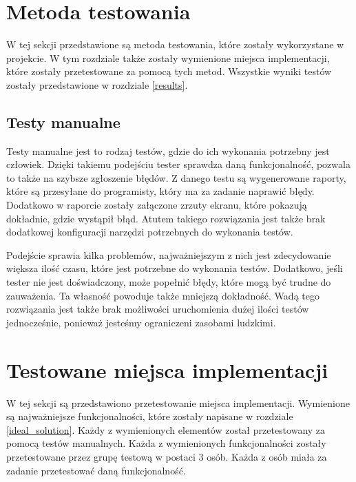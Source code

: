 \section{Metoda testowania}
W tej sekcji przedstawione są metoda testowania, które zostały wykorzystane w projekcie. W tym rozdziale także zostały wymienione miejsca implementacji, które zostały przetestowane za pomocą tych metod. Wszystkie wyniki testów zostały przedstawione w rozdziale \ref{results}. 

\subsection{Testy manualne}
Testy manualne jest to rodzaj testów, gdzie do ich wykonania potrzebny jest człowiek. Dzięki takiemu podejściu tester sprawdza daną funkcjonalność, pozwala to także na szybsze zgłoszenie błędów. Z danego testu są wygenerowane raporty, które są przesyłane do programisty, który ma za zadanie naprawić błędy. Dodatkowo w raporcie zostały załączone zrzuty ekranu, które pokazują dokładnie, gdzie wystąpił błąd. Atutem takiego rozwiązania jest także brak dodatkowej konfiguracji narzędzi potrzebnych do wykonania testów.

Podejście sprawia kilka problemów, najważniejszym z nich jest zdecydowanie większa ilość czasu, które jest potrzebne do wykonania testów. Dodatkowo, jeśli tester nie jest doświadczony, może popełnić błędy, które mogą być trudne do zauważenia. Ta własność powoduje także mniejszą dokładność. Wadą tego rozwiązania jest także brak możliwości uruchomienia dużej ilości testów jednocześnie, ponieważ jesteśmy ograniczeni zasobami ludzkimi. 

\section{Testowane miejsca implementacji}
W tej sekcji są przedstawiono przetestowanie miejsca implementacji. Wymienione są najważniejsze funkcjonalności, które zostały napisane w rozdziale \ref{ideal_solution}. Każdy z wymienionych elementów został przetestowany za pomocą testów manualnych. Każda z wymienionych funkcjonalności zostały przetestowane przez grupę testową w postaci 3 osób. Każda z osób miała za zadanie przetestować daną funkcjonalność.

